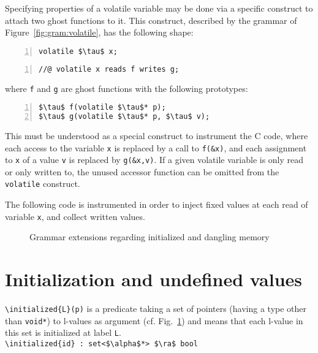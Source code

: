 Specifying properties of a volatile variable may be done via a
specific construct to attach two ghost functions to it. This
construct, described by the grammar of Figure~\ref{fig:gram:volatile}, has
the following shape:
\begin{lstlisting}[style=c-basic,firstnumber=1,name=volatile,numbers=left]
volatile $\tau$ x;
\end{lstlisting}
\begin{lstlisting}[style=c-basic,name=volatile,numbers=left]
//@ volatile x reads f writes g;
\end{lstlisting}
where \lstinline|f| and \lstinline|g| are ghost functions with the following prototypes:
\begin{lstlisting}[style=c-basic,name=volatile,numbers=left]
$\tau$ f(volatile $\tau$* p);
$\tau$ g(volatile $\tau$* p, $\tau$ v);
\end{lstlisting}
This must be understood as a special construct to instrument the C
code, where each access to the variable \lstinline|x| is replaced by a call
to \lstinline|f(&x)|, and each assignment to \lstinline|x| of a value
\lstinline|v|
is replaced by \lstinline|g(&x,v)|. If a given volatile variable is only read 
or only written to, the unused accessor function can be omitted from the 
\lstinline|volatile| construct.

\begin{example}
  The following code is instrumented in order to inject fixed values
  at each read of variable \lstinline|x|, and collect written values.
\end{example}



\begin{figure}[t]
  \begin{cadre}
      
    \end{cadre}
  \caption{Grammar extensions regarding initialized and dangling memory}
\label{fig:gram:initialized}
\end{figure}

\section{Initialization and undefined values}
\label{sec:initialized}
\lstinline|\initialized{L}(p)| is a predicate taking a set of pointers
(having a type other than \lstinline|void*|) to l-values as
argument (cf. Fig.~\ref{fig:gram:initialized}) and means that each l-value in this set is initialized at label \lstinline|L|.
\\ \makebox[5mm]{} \lstinline|\initialized{id} : set<$\alpha$*> $\ra$ bool|


